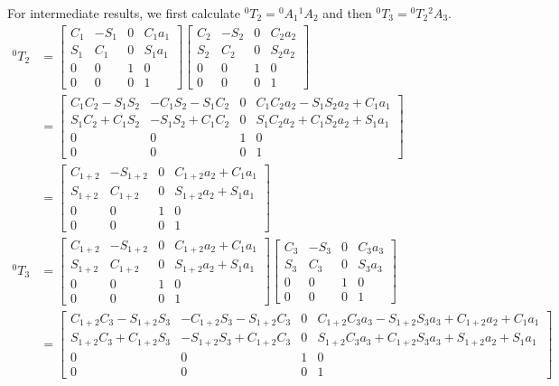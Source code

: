 \documentclass[a4paper,11pt]{article}
\begin{document}
\begin {enumerate}
\begin{enumerate}
    For intermediate results, we first calculate $^0T_2 = {^0A_1}{^1A_2}$ and then $^0T_3 = {^0T_2}{^2A_3}$.
    \begin{align*}
        ^0T_2 &= \begin{bmatrix} C_1 & -S_1 & 0 & C_1a_1\\ S_1 & C_1 & 0 & S_1a_1\\ 0 & 0 & 1 & 0\\ 0 & 0 & 0 & 1 \end{bmatrix} \begin{bmatrix} C_2 & -S_2 & 0 & C_2a_2\\ S_2 & C_2 & 0 & S_2a_2\\ 0 & 0 & 1 & 0\\ 0 & 0 & 0 & 1 \end{bmatrix}\\
        &= \begin{bmatrix} C_1C_2 - S_1S_2 & -C_1S_2 - S_1C_2 & 0 & C_1C_2a_2 -S_1S_2a_2 + C_1a_1\\ S_1C_2 + C_1S_2 & -S_1S_2 + C_1C_2 & 0 & S_1C_2a_2 + C_1S_2a_2 + S_1a_1\\ 0 & 0 & 1 & 0\\ 0 & 0 & 0 & 1 \end{bmatrix}\\
        &= \begin{bmatrix} C_{1+2} & -S_{1+2} & 0 & C_{1+2}a_2 + C_1a_1\\ S_{1+2} & C_{1+2} & 0 & S_{1+2}a_2 + S_1a_1\\ 0 & 0 & 1 & 0\\ 0 & 0 & 0 & 1 \end{bmatrix}\\
        ^0T_3 &= \begin{bmatrix} C_{1+2} & -S_{1+2} & 0 & C_{1+2}a_2 + C_1a_1\\ S_{1+2} & C_{1+2} & 0 & S_{1+2}a_2 + S_1a_1\\ 0 & 0 & 1 & 0\\ 0 & 0 & 0 & 1 \end{bmatrix} \begin{bmatrix} C_3 & -S_3 & 0 & C_3a_3\\ S_3 & C_3 & 0 & S_3a_3\\ 0 & 0 & 1 & 0\\ 0 & 0 & 0 & 1 \end{bmatrix}\\
        &= \begin{bmatrix} C_{1+2}C_3 - S_{1+2}S_3 & -C_{1+2}S_3 - S_{1+2}C_3 & 0 & C_{1+2}C_3a_3 - S_{1+2}S_3a_3 + C_{1+2}a_2+C_1a_1\\ S_{1+2}C_3 + C_{1+2}S_3 & -S_{1+2}S_3+C_{1+2}C_3 & 0 & S_{1+2}C_3a_3 + C_{1+2}S_3a_3 + S_{1+2}a_2 + S_1a_1\\ 0 & 0 & 1 & 0\\ 0 & 0 & 0 & 1 \end{bmatrix}\\

\end{align*}
\end{enumerate}
\end{enumerate}
\end{document}
